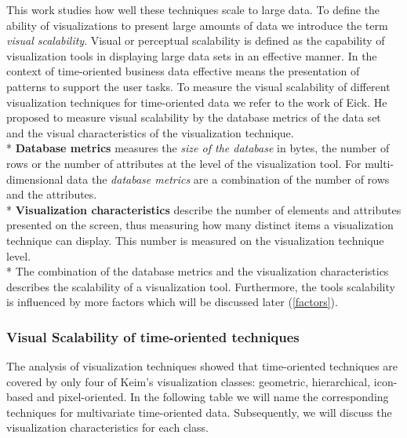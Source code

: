 This work studies how well these techniques scale to large data. To define the ability of visualizations to present large amounts of data we introduce the term \textit{visual scalability}.
Visual or perceptual scalability is defined as the capability of visualization tools in displaying large data sets in an effective manner\cite{Eick2002}. In the context of time-oriented business data effective means the presentation of patterns to support the user tasks. To measure the visual scalability of different visualization techniques for time-oriented data we refer to the work of Eick\cite{Eick2002}. He proposed to measure visual scalability by the database metrics of the data set and the visual characteristics of the visualization technique. \\*
\textbf{Database metrics} measures the \textit{size of the database} in bytes, the number of rows or the number of attributes at the level of the visualization tool. For multi-dimensional data the \textit{database metrics} are a combination of the number of rows and the attributes. \\*
\textbf{Visualization characteristics} describe the number of elements and attributes presented on the screen, thus measuring how many distinct items a visualization technique can display. This number is measured on the visualization technique level.\\*
The combination of the database metrics and the visualization characteristics describes the scalability of a visualization tool. Furthermore, the tools scalability is influenced by more factors which will be discussed later (\ref{factors}).

\subsubsection{Visual Scalability of time-oriented techniques}\label{visualization}
The analysis of visualization techniques showed that time-oriented techniques are covered by only four of Keim's visualization classes: geometric, hierarchical, icon-based and pixel-oriented. In the following table we will name the corresponding techniques for multivariate time-oriented data. Subsequently, we will discuss the visualization characteristics for each class. 


